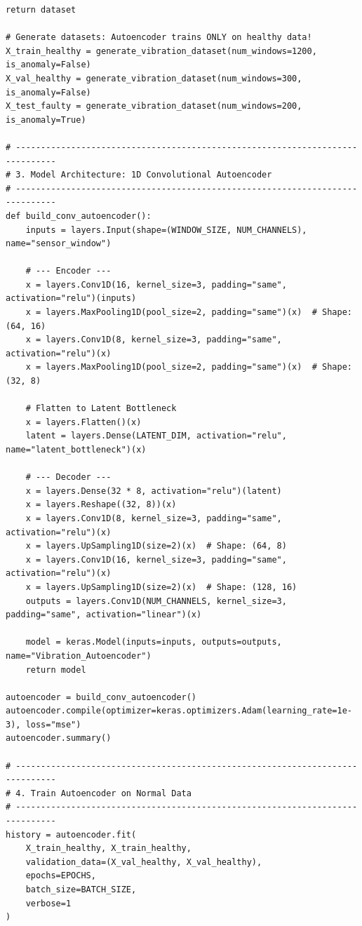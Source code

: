 \begin{lstlisting}[style=pythonstyle, caption={Complete Autoencoder Training, Threshold Calibration, and Int8 Quantization Pipeline.}, label={lst:autoencoder_pipeline}]
    return dataset

# Generate datasets: Autoencoder trains ONLY on healthy data!
X_train_healthy = generate_vibration_dataset(num_windows=1200, is_anomaly=False)
X_val_healthy = generate_vibration_dataset(num_windows=300, is_anomaly=False)
X_test_faulty = generate_vibration_dataset(num_windows=200, is_anomaly=True)

# ------------------------------------------------------------------------------
# 3. Model Architecture: 1D Convolutional Autoencoder
# ------------------------------------------------------------------------------
def build_conv_autoencoder():
    inputs = layers.Input(shape=(WINDOW_SIZE, NUM_CHANNELS), name="sensor_window")

    # --- Encoder ---
    x = layers.Conv1D(16, kernel_size=3, padding="same", activation="relu")(inputs)
    x = layers.MaxPooling1D(pool_size=2, padding="same")(x)  # Shape: (64, 16)
    x = layers.Conv1D(8, kernel_size=3, padding="same", activation="relu")(x)
    x = layers.MaxPooling1D(pool_size=2, padding="same")(x)  # Shape: (32, 8)
    
    # Flatten to Latent Bottleneck
    x = layers.Flatten()(x)
    latent = layers.Dense(LATENT_DIM, activation="relu", name="latent_bottleneck")(x)

    # --- Decoder ---
    x = layers.Dense(32 * 8, activation="relu")(latent)
    x = layers.Reshape((32, 8))(x)
    x = layers.Conv1D(8, kernel_size=3, padding="same", activation="relu")(x)
    x = layers.UpSampling1D(size=2)(x)  # Shape: (64, 8)
    x = layers.Conv1D(16, kernel_size=3, padding="same", activation="relu")(x)
    x = layers.UpSampling1D(size=2)(x)  # Shape: (128, 16)
    outputs = layers.Conv1D(NUM_CHANNELS, kernel_size=3, padding="same", activation="linear")(x)

    model = keras.Model(inputs=inputs, outputs=outputs, name="Vibration_Autoencoder")
    return model

autoencoder = build_conv_autoencoder()
autoencoder.compile(optimizer=keras.optimizers.Adam(learning_rate=1e-3), loss="mse")
autoencoder.summary()

# ------------------------------------------------------------------------------
# 4. Train Autoencoder on Normal Data
# ------------------------------------------------------------------------------
history = autoencoder.fit(
    X_train_healthy, X_train_healthy,
    validation_data=(X_val_healthy, X_val_healthy),
    epochs=EPOCHS,
    batch_size=BATCH_SIZE,
    verbose=1
)


\end{lstlisting}
